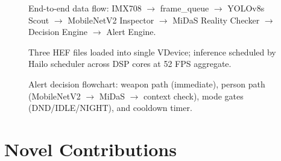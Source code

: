 \documentclass[12pt,a4paper]{article}
\begin{document}
\begin{figure}[h]
  \centering
  \caption{End-to-end data flow: IMX708 $\to$ frame\_queue $\to$ YOLOv8s Scout
           $\to$ MobileNetV2 Inspector $\to$ MiDaS Reality Checker $\to$ Decision
           Engine $\to$ Alert Engine.}
\end{figure}

\begin{figure}[h]
  \centering
  \caption{Three HEF files loaded into single VDevice; inference scheduled by Hailo
           scheduler across DSP cores at 52 FPS aggregate.}
\end{figure}

\begin{figure}[h]
  \centering
  \caption{Alert decision flowchart: weapon path (immediate), person path
           (MobileNetV2 $\to$ MiDaS $\to$ context check), mode gates (DND/IDLE/NIGHT),
           and cooldown timer.}
\end{figure}

\section{Novel Contributions}
\end{document}
